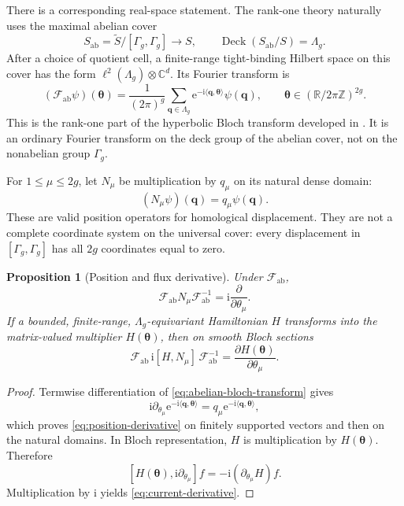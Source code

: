 \documentclass[11pt]{article}
\newtheorem{proposition}[theorem]{Proposition}
\theoremstyle{definition}
\theoremstyle{remark}
\newcommand{\CC}{\mathbb C}
\newcommand{\RR}{\mathbb R}
\newcommand{\ZZ}{\mathbb Z}
\newcommand{\ii}{\mathrm i}
\newcommand{\e}{\mathrm e}
\begin{document}
There is a corresponding real-space statement.  The rank-one theory naturally
uses the maximal abelian cover
\[
           S_{\mathrm{ab}}
             =\widetilde S/[\Gamma_g,\Gamma_g]
             \longrightarrow S,
           \qquad \operatorname{Deck}(S_{\mathrm{ab}}/S)=\Lambda_g.
           \tag{4.20}\label{eq:maximal-abelian-cover}
\]
After a choice of quotient cell, a finite-range tight-binding Hilbert space
on this cover has the form
\(\ell^2(\Lambda_g)\otimes\CC^d\).  Its Fourier transform is
\[
 (\mathscr F_{\mathrm{ab}}\psi)(\bm\theta)
   =\frac{1}{(2\pi)^g}
      \sum_{\bm q\in\Lambda_g}
       \e^{-\ii\langle\bm q,\bm\theta\rangle}\psi(\bm q),
 \qquad \bm\theta\in(\RR/2\pi\ZZ)^{2g}.
 \tag{4.21}\label{eq:abelian-bloch-transform}
\]
This is the rank-one part of the hyperbolic Bloch transform developed in
\cite{MaciejkoRayan2022,NagyRayan2024}.  It is an ordinary Fourier transform
on the deck group of the abelian cover, not on the nonabelian group
\(\Gamma_g\).

For \(1\leq\mu\leq2g\), let \(N_\mu\) be multiplication by \(q_\mu\) on its
natural dense domain:
\[
                       (N_\mu\psi)(\bm q)=q_\mu\psi(\bm q).
                       \tag{4.22}\label{eq:abelian-position}
\]
These are valid position operators for homological displacement.  They are
not a complete coordinate system on the universal cover: every displacement
in \([\Gamma_g,\Gamma_g]\) has all \(2g\) coordinates equal to zero.

\begin{proposition}[Position and flux derivative]
\label{prop:position-flux}
Under \(\mathscr F_{\mathrm{ab}}\),
\[
        \mathscr F_{\mathrm{ab}}N_\mu\mathscr F_{\mathrm{ab}}^{-1}
             =\ii\frac{\partial}{\partial\theta_\mu}.
        \tag{4.23}\label{eq:position-derivative}
\]
If a bounded, finite-range, \(\Lambda_g\)-equivariant Hamiltonian \(H\)
transforms into the matrix-valued multiplier \(H(\bm\theta)\), then on smooth
Bloch sections
\[
    \mathscr F_{\mathrm{ab}}\,\ii[H,N_\mu]\,
       \mathscr F_{\mathrm{ab}}^{-1}
             =\frac{\partial H(\bm\theta)}{\partial\theta_\mu}.
    \tag{4.24}\label{eq:current-derivative}
\]
\end{proposition}

\begin{proof}
Termwise differentiation of \eqref{eq:abelian-bloch-transform} gives
\[
 \ii\partial_{\theta_\mu}
  \e^{-\ii\langle\bm q,\bm\theta\rangle}
   =q_\mu\e^{-\ii\langle\bm q,\bm\theta\rangle},
\]
which proves \eqref{eq:position-derivative} on finitely supported vectors and
then on the natural domains.  In Bloch representation, \(H\) is
multiplication by \(H(\bm\theta)\).  Therefore
\[
 [H(\bm\theta),\ii\partial_{\theta_\mu}]f
       =-\ii(\partial_{\theta_\mu}H)f.
\]
Multiplication by \(\ii\) yields \eqref{eq:current-derivative}.
\end{proof}
\end{document}
